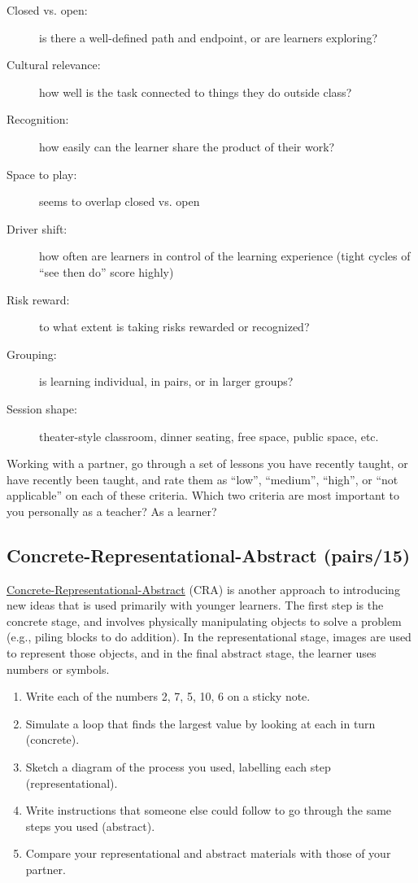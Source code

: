 \begin{description}
\item[Closed vs. open:]
is there a well-defined path and endpoint, or are learners
exploring?
\item[Cultural relevance:]
how well is the task connected to things they do outside class?
\item[Recognition:]
how easily can the learner share the product of their work?
\item[Space to play:]
seems to overlap closed vs. open
\item[Driver shift:]
how often are learners in control of the learning experience (tight
cycles of ``see then do'' score highly)
\item[Risk reward:]
to what extent is taking risks rewarded or recognized?
\item[Grouping:]
is learning individual, in pairs, or in larger groups?
\item[Session shape:]
theater-style classroom, dinner seating, free space, public space,
etc.
\end{description}

Working with a partner, go through a set of lessons you have recently
taught, or have recently been taught, and rate them as ``low'', ``medium'',
``high'', or ``not applicable'' on each of these criteria. Which two
criteria are most important to you personally as a teacher? As a
learner?

\subsection*{Concrete-Representational-Abstract (pairs/15)}

\href{https://makingeducationfun.wordpress.com/2012/04/29/concrete-representational-abstract-cra/}{Concrete-Representational-Abstract} (CRA) is another approach to
introducing new ideas that is used primarily with younger
learners. The first step is the concrete stage, and involves
physically manipulating objects to solve a problem (e.g., piling
blocks to do addition). In the representational stage, images are
used to represent those objects, and in the final abstract stage, the
learner uses numbers or symbols.

\begin{enumerate}
\item
  Write each of the numbers 2, 7, 5, 10, 6 on a sticky note.
\item
  Simulate a loop that finds the largest value by looking at each in
  turn (concrete).
\item
  Sketch a diagram of the process you used, labelling each step
  (representational).
\item
  Write instructions that someone else could follow to go through the
  same steps you used (abstract).
\item
  Compare your representational and abstract materials with those of
  your partner.
\end{enumerate}
